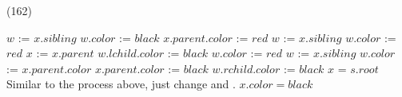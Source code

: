 \begin{theorem}{(162)}
\begin{algorithm}[H]
        \begin{algorithmic}[1]
                        \State $w$ := $x.sibling$
                            \State $w.color$ := $black$
                            \State $x.parent.color$ := $red$
                            \State {}
                            \State $w$ := $x.sibling$
                            \State $w.color$ := $red$
                            \State $x$ := $x.parent$
                            \State $w.lchild.color$ := $black$
                            \State $w.color$ := $red$
                            \State {}
                            \State $w$ := $x.sibling$
                        \Else
                            \State $w.color$ := $x.parent.color$
                            \State $x.parent.color$ := $black$
                            \State $w.rchild.color$ := $black$
                            \State {}
                            \State $x$ = $s.root$
                        \EndIf
                    \Else
                        \State Similar to the process above, just change  and .
                    \EndIf
                \EndWhile
                \State $x.color = black$
            \EndFunction
        \end{algorithmic}
    \end{algorithm}
\end{theorem}
